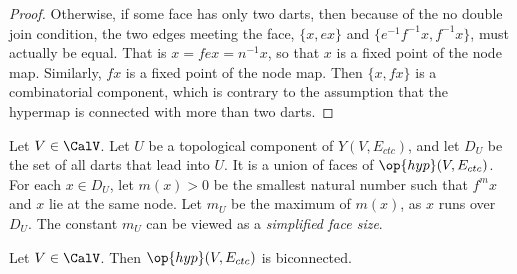 \begin{proof}
Otherwise,
if some face has only two darts, then because of the no double join
condition, the two edges meeting the face, $\{x, e x\}$ and $\{ e^{-1} f^{-1} x, f^{-1}
x\}$, must actually be equal.  That is $ x = f e x = n^{-1} x$, so that
$x$ is a fixed point of the node map.  Similarly, $f x$ is a fixed
point of the node map.  Then $\{x, f x\}$ is a combinatorial
component, which is contrary to the assumption that the hypermap is
connected with more than two darts.
\end{proof}


\begin{definition}[$D_U$,~$m_U$]
Let $V\in \CalV$.  Let $U$ be a topological component of
$Y(V,E_{ctc})$, and let $D_U$ be the set of all darts that lead into
$U$.  It is a union of faces of $\op{hyp}(V,E_{ctc})$.  For each $x\in
D_U$, let $m(x) >0$ be the smallest natural number such that $f^{m}
x$ and $x$ lie at the same node.   Let $m_U$ be the maximum of $m(x)$, as
$x$ runs over $D_U$.  The constant $m_U$ can be viewed as a
{\it simplified face size}. 
%
%
%
\end{definition}

\begin{lemma}[biconnected]\label{lemma:biconnected}
  Let $V\in \CalV$.  Then $\op{hyp}(V,E_{ctc})$ is biconnected.
\end{lemma}

